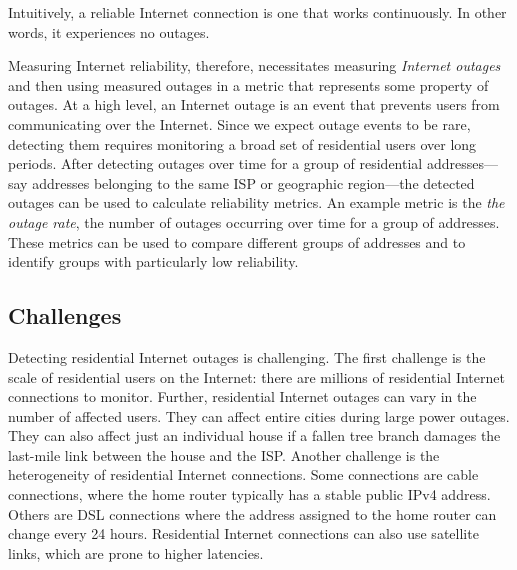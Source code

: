 
Intuitively, a reliable Internet connection is one that works
continuously. In other words, it experiences no outages. 


Measuring Internet reliability, therefore, necessitates measuring
\emph{Internet outages} and then using measured outages in a metric that
represents some property of outages. At a high level, an Internet
outage is an event that prevents users from communicating over the
Internet. Since we expect outage events to be rare, detecting them
requires monitoring a broad set of residential users over long
periods. After detecting outages over time for a group of residential
addresses---say addresses belonging to the same ISP or geographic
region---the detected outages can be used to calculate reliability
metrics. An example metric is the \emph{the outage rate}, the number of
outages occurring over time for a group of addresses. These metrics
can be used to compare different groups of addresses and to identify
groups with particularly low reliability.

\subsection{Challenges}



Detecting residential Internet outages is challenging. The first challenge is the scale of residential users on the Internet: there
are millions of residential Internet connections to monitor. Further,
residential Internet outages can vary in the number of
affected users. They can affect entire cities during large power
outages. They can also affect just an individual house if a fallen
tree branch damages the last-mile link between the house and the
ISP.  Another challenge is the heterogeneity of residential Internet
connections. Some connections are cable connections, where the home router
typically has a stable public IPv4 address. Others are DSL
connections where the address assigned to the home router can change
every 24 hours. Residential Internet connections can also use
satellite links, which are prone to higher latencies. 

